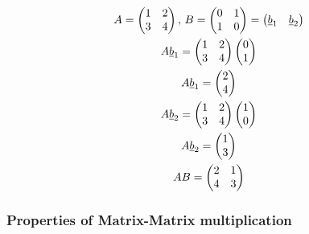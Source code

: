 \begin{example}
    \begin{gather*}
        A = \begin{pmatrix}
            1 & 2 \\ 3 & 4
        \end{pmatrix}, \,  
        B = \begin{pmatrix}
            0 & 1 \\ 1 & 0 
        \end{pmatrix} = \begin{pmatrix}
            \underline{b}_1 & \underline{b}_2
        \end{pmatrix}
         \\ 
        A\underline{b}_1 = \begin{pmatrix}
            1 & 2 \\ 3 & 4 
        \end{pmatrix} \begin{pmatrix}
          0 \\ 1 
        \end{pmatrix} \\ 
        A\underline{b}_1 = \begin{pmatrix}
            2 \\ 4 
        \end{pmatrix} \\ 
        A\underline{b}_2 = \begin{pmatrix}
            1 & 2 \\ 3 & 4 
        \end{pmatrix} \begin{pmatrix}
            1 \\ 0
        \end{pmatrix} \\ 
        A\underline{b}_2 = \begin{pmatrix}
            1 \\ 3 
        \end{pmatrix} \\ 
        AB = \begin{pmatrix}
            2 & 1 \\ 4 & 3 
        \end{pmatrix}
    \end{gather*}
\end{example}

\subsubsection{Properties of Matrix-Matrix multiplication}

